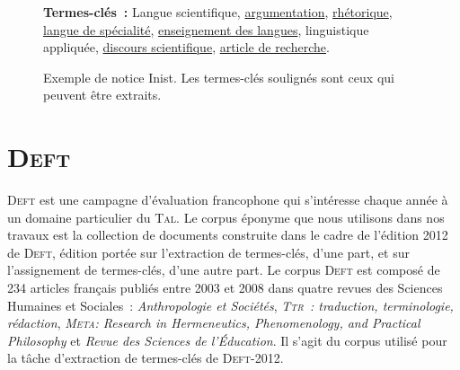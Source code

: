 \begin{figure}[!h]
{{          \textbf{Termes-clés~:} Langue scientifique, \underline{argumentation},
          \underline{rhétorique}, \underline{langue de spécialité},
          \underline{enseignement des langues}, linguistique appliquée,
          \underline{discours scientifique}, \underline{article de recherche}. 
        }
      }
%
%
      \caption[Exemple de notice Inist]{
        Exemple de notice Inist. Les termes-clés soulignés sont ceux qui peuvent
        être extraits.
        \label{fig:example_inist}
      }
    \end{figure}


  \section[\textsc{Deft}]{\textsc{Deft}~\textnormal{\large\cite{paroubek2012deft}}}
  \label{sec:main-data_description-deft_data}
    \textsc{Deft} est une campagne d'évaluation francophone qui s'intéresse
    chaque année à un domaine particulier du \textsc{Tal}. Le corpus éponyme que
    nous utilisons dans nos travaux est la collection de documents construite
    dans le cadre de l'édition 2012 de \textsc{Deft}, édition portée sur
    l'extraction de termes-clés, d'une part, et sur l'assignement de
    termes-clés, d'une autre part. Le corpus \textsc{Deft} est composé de 234
    articles français publiés entre 2003 et 2008 dans quatre revues des Sciences
    Humaines et Sociales~: \textit{Anthropologie et Sociétés},
    \textit{\textsc{Ttr}~: traduction, terminologie, rédaction},
    \textit{\textsc{Meta}: Research in Hermeneutics, Phenomenology, and
    Practical Philosophy} et \textit{Revue des Sciences de l'Éducation}. Il
    s'agit du corpus utilisé pour la tâche d'extraction de termes-clés de
    \textsc{Deft}-2012.
    
